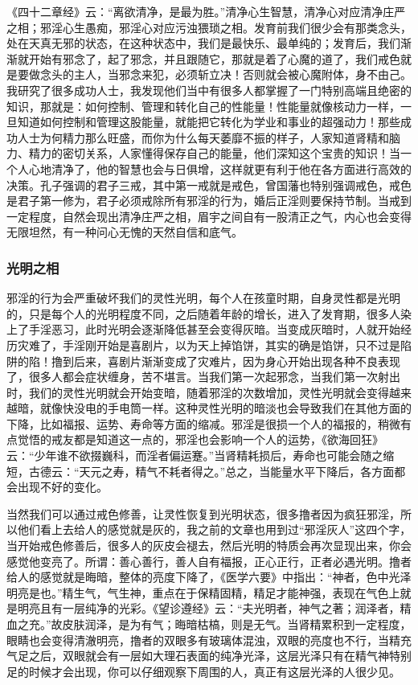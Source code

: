 《四十二章经》云：“离欲清净，是最为胜。”清净心生智慧，清净心对应清净庄严之相；邪淫心生愚痴，邪淫心对应污浊猥琐之相。发育前我们很少会有那类念头，处在天真无邪的状态，在这种状态中，我们是最快乐、最单纯的；发育后，我们渐渐就开始有邪念了，起了邪念，并且跟随它，那就是着了心魔的道了，我们戒色就是要做念头的主人，当邪念来犯，必须斩立决！否则就会被心魔附体，身不由己。我研究了很多成功人士，我发现他们当中有很多人都掌握了一门特别高端且绝密的知识，那就是：如何控制、管理和转化自己的性能量！性能量就像核动力一样，一旦知道如何控制和管理这股能量，就能把它转化为学业和事业的超强动力！那些成功人士为何精力那么旺盛，而你为什么每天萎靡不振的样子，人家知道肾精和脑力、精力的密切关系，人家懂得保存自己的能量，他们深知这个宝贵的知识！当一个人心地清净了，他的智慧也会与日俱增，这样就更有利于他在各方面进行高效的决策。孔子强调的君子三戒，其中第一戒就是戒色，曾国藩也特别强调戒色，戒色是君子第一修为，君子必须戒除所有邪淫的行为，婚后正淫则要保持节制。当戒到一定程度，自然会现出清净庄严之相，眉宇之间自有一股清正之气，内心也会变得无限坦然，有一种问心无愧的天然自信和底气。

\subsubsection{光明之相}

邪淫的行为会严重破坏我们的灵性光明，每个人在孩童时期，自身灵性都是光明的，只是每个人的光明程度不同，之后随着年龄的增长，进入了发育期，很多人染上了手淫恶习，此时光明会逐渐降低甚至会变得灰暗。当变成灰暗时，人就开始经历灾难了，手淫刚开始是喜剧片，以为天上掉馅饼，其实的确是馅饼，只不过是陷阱的陷！撸到后来，喜剧片渐渐变成了灾难片，因为身心开始出现各种不良表现了，很多人都会症状缠身，苦不堪言。当我们第一次起邪念，当我们第一次射出时，我们的灵性光明就会开始变暗，随着邪淫的次数增加，灵性光明就会变得越来越暗，就像快没电的手电筒一样。这种灵性光明的暗淡也会导致我们在其他方面的下降，比如福报、运势、寿命等方面的缩减。邪淫是很损一个人的福报的，稍微有点觉悟的戒友都是知道这一点的，邪淫也会影响一个人的运势，《欲海回狂》云：“少年谁不欲掇巍科，而淫者偏运蹇。”当肾精耗损后，寿命也可能会随之缩短，古德云：“天元之寿，精气不耗者得之。”总之，当能量水平下降后，各方面都会出现不好的变化。

当然我们可以通过戒色修善，让灵性恢复到光明状态，很多撸者因为疯狂邪淫，所以他们看上去给人的感觉就是灰的，我之前的文章也用到过“邪淫灰人”这四个字，当开始戒色修善后，很多人的灰皮会褪去，然后光明的特质会再次显现出来，你会感觉他变亮了。所谓：善心善行，善人自有福报，正心正行，正者必遇光明。撸者给人的感觉就是晦暗，整体的亮度下降了，《医学六要》中指出：“神者，色中光泽明亮是也。”精生气，气生神，重点在于保精固精，精足才能神强，表现在气色上就是明亮且有一层纯净的光彩。《望诊遵经》云：“夫光明者，神气之著；润泽者，精血之充。”故皮肤润泽，是为有气；晦暗枯槁，则是无气。当肾精累积到一定程度，眼睛也会变得清澈明亮，撸者的双眼多有玻璃体混浊，双眼的亮度也不行，当精充气足之后，双眼就会有一层如大理石表面的纯净光泽，这层光泽只有在精气神特别足的时候才会出现，你可以仔细观察下周围的人，真正有这层光泽的人很少见。


